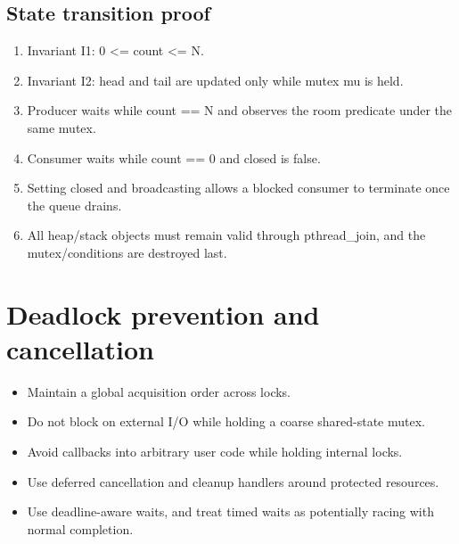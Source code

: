 \documentclass[11pt,letterpaper,oneside]{report}
\begin{document}
\section{State transition proof}
\begin{enumerate}
\item Invariant I1: 0 <= count <= N.
\item Invariant I2: head and tail are updated only while mutex mu is held.
\item Producer waits while count == N and observes the room predicate under the same mutex.
\item Consumer waits while count == 0 and closed is false.
\item Setting closed and broadcasting allows a blocked consumer to terminate once the queue drains.
\item All heap/stack objects must remain valid through pthread\_join, and the mutex/conditions are destroyed last.
\end{enumerate}
\chapter{Deadlock prevention and cancellation}
\begin{itemize}
\item Maintain a global acquisition order across locks.
\item Do not block on external I/O while holding a coarse shared-state mutex.
\item Avoid callbacks into arbitrary user code while holding internal locks.
\item Use deferred cancellation and cleanup handlers around protected resources.
\item Use deadline-aware waits, and treat timed waits as potentially racing with normal completion.
\end{itemize}
\end{document}
